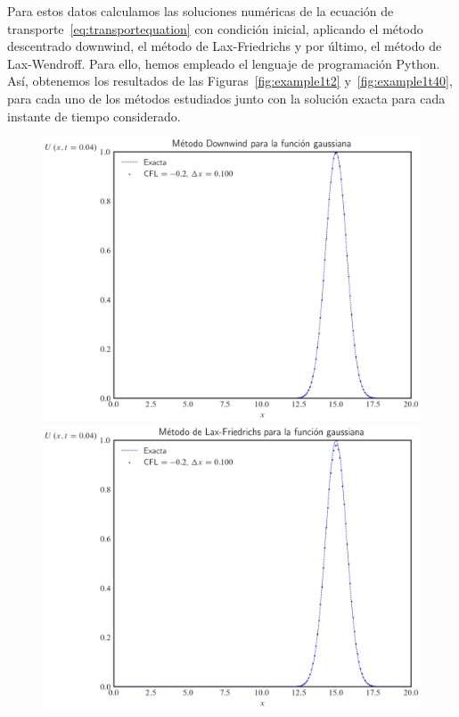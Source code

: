 Para estos datos calculamos las soluciones numéricas de la ecuación
de transporte~\eqref{eq:transportequation} con condición inicial,
aplicando el método descentrado downwind, el método de Lax-Friedrichs
y por último, el método de Lax-Wendroff.
Para ello, hemos empleado el lenguaje de programación Python.
Así, obtenemos los resultados de las Figuras~\ref{fig:example1t2}
y~\ref{fig:example1t40}, para cada uno de los métodos estudiados
junto con la solución exacta para cada instante de tiempo
considerado.

\begin{figure}[ht!]
    \centering
    \includegraphics[width=.30\paperwidth]{../snapshots/downwindgaussian1d-2.png}
    \includegraphics[width=.30\paperwidth]{../snapshots/lax-friedrichsgaussiana1d-2.png}

\end{figure}
